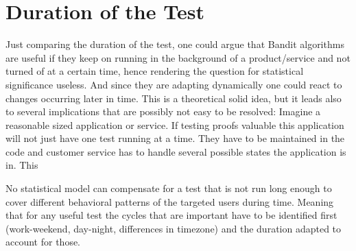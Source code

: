 \documentclass[main.tex]{subfiles}
\begin{document}
\section{Duration of the Test}
Just comparing the duration of the test, one could argue that Bandit algorithms are useful if they keep on running in the background of a product/service and not turned of at a certain time, hence rendering the question for statistical significance useless. And since they are adapting dynamically one could react to changes occurring later in time. This is a theoretical solid idea, but it leads also to several implications that are possibly not easy to be resolved: Imagine a reasonable sized application or service. If testing proofs valuable this application will not just have one test running at a time. They have to be maintained in the code and customer service has to handle several possible states the application is in. This 

No statistical model can compensate for a test that is not run long enough to cover different behavioral patterns of the targeted users during time. Meaning that for any useful test the cycles that are important have to be identified first (work-weekend, day-night, differences in timezone) and the duration adapted to account for those.

\end{document}
